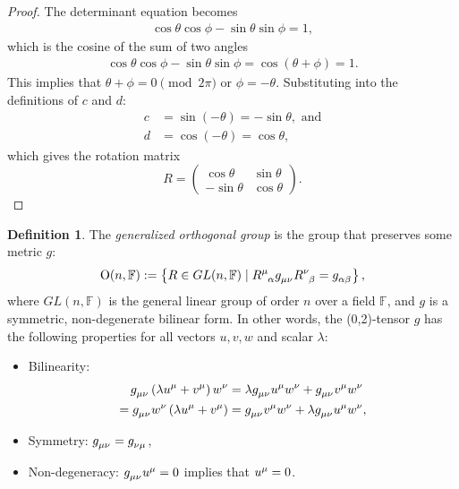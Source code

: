 \documentclass{amsart}
\theoremstyle{definition}
\newtheorem{definition}[theorem]{Definition}
\theoremstyle{remark}
\begin{document}
\begin{proof}
  The determinant equation becomes
  \begin{align*}
    \cos\theta\cos\phi - \sin\theta\sin\phi = 1,
  \end{align*}
  which is the cosine of the sum of two angles
  \begin{align*}
    \cos\theta\cos\phi - \sin\theta\sin\phi = \cos\left(\theta+\phi\right) = 1.
  \end{align*}
  This implies that $\theta+\phi = 0 \pmod{2\pi}$ or $\phi=-\theta$. Substituting into the definitions of $c$ and $d$:
  \begin{align*}
    c&=\sin(-\theta)=-\sin\theta,\text{ and}\\
    d&=\cos(-\theta)=\cos\theta,
  \end{align*}
  which gives the rotation matrix
  \begin{equation*}
    R =
    \begin{pmatrix}
      \cos\theta & \sin\theta \\
      -\sin\theta & \cos\theta
    \end{pmatrix}.
  \end{equation*}
\end{proof}

\begin{definition}
  The \emph{generalized orthogonal group} is the group that preserves some metric $g$:
  \begin{align*}
    \mathrm{O}(n, \mathbb{F}) := \left\{ R \in GL(n, \mathbb{F}) \mid \tensor{R}{^\mu_\alpha} \tensor{g}{_\mu_\nu} \tensor{R}{^\nu_\beta} = \tensor{g}{_\alpha_\beta}\right\},
  \end{align*}
  where $GL(n, \mathbb{F})$ is the general linear group of order $n$ over a field $\mathbb{F}$, and $g$ is a symmetric, non-degenerate bilinear form. In other words, the (0,2)-tensor $g$ has the following properties for all vectors $u, v, w$ and scalar $\lambda$:
  \begin{itemize}
    \item Bilinearity:
      \begin{align*}
        \tensor{g}{_\mu_\nu} \left( \lambda \tensor{u}{^\mu} + \tensor{v}{^\mu} \right) \tensor{w}{^\nu}&= \lambda \tensor{g}{_\mu_\nu} \tensor{u}{^\mu} \tensor{w}{^\nu} + \tensor{g}{_\mu_\nu} \tensor{v}{^\mu} \tensor{w}{^\nu}\\
          = \tensor{g}{_\mu_\nu} \tensor{w}{^\nu} \left( \lambda \tensor{u}{^\mu} + \tensor{v}{^\mu} \right) &= \tensor{g}{_\mu_\nu} \tensor{v}{^\mu} \tensor{w}{^\nu} + \lambda \tensor{g}{_\mu_\nu} \tensor{u}{^\mu} \tensor{w}{^\nu},
      \end{align*}
    \item Symmetry: $\tensor{g}{_\mu_\nu} = \tensor{g}{_\nu_\mu}$,
    \item Non-degeneracy: $\tensor{g}{_\mu_\nu}\tensor{u}{^\mu}=0$ implies that $\tensor{u}{^\mu}=0$.
  \end{itemize}
\end{definition}
\end{document}
